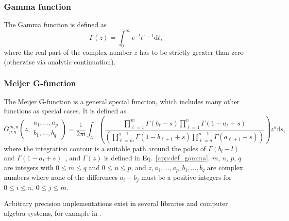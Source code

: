 \subsubsection*{Gamma function}
The Gamma funciton is defined as~\cite[Eq.~5.2.1]{NIST:DLMF}
\begin{equation}
\label{app:def_gamma}
\Gamma\left(z\right)=\int_{0}^{\infty}e^{-t}t^{z-1}\mathrm{d}t,
\end{equation}
where the real part of the complex number $z$ has to be strictly greater than zero (otherwise via analytic continuation).
\subsubsection*{Meijer G-function}
The Meijer G-function is a general special function, which includes many other functions as special cases. It is defined as
\begin{equation}
\label{app:def_meijerG}
G^{m,n}_{p,q}\left(z,
\begin{matrix}
a_1,...,a_p\\
b_1,...,b_q
\end{matrix}
\right)
=
\frac{1}{2\pi\mathrm{i}}\int_{L%
}\left({\textstyle\frac{\prod\limits_{\ell=1}^{m}\Gamma\left(b_{\ell}-s\right%
)\prod\limits_{\ell=1}^{n}\Gamma\left(1-a_{\ell}+s\right)}{\left(\prod\limits_%
{\ell=m}^{q-1}\Gamma\left(1-b_{\ell+1}+s\right)\prod\limits_{\ell=n}^{p-1}%
\Gamma\left(a_{\ell+1}-s\right)\right)}}\right)z^{s}\mathrm{d}s,
\end{equation}
where the integration contour is a suitable path around the poles of $\Gamma(b_l-l)$ and \mbox{$\Gamma(1-a_l+s)$}~\cite[Eq.~16.17.1]{NIST:DLMF}, and $\Gamma(z)$ is defined in Eq.~\eqref{app:def_gamma}. $m$, $n$, $p$, $q$ are integers with $0 \leq m \leq q$ and $0 \leq n \leq p$, and $z,a_1,...,a_p,b_1,...,b_q$ are complex numbers where none of the differences $a_i-b_j$ must be a positive integers for $0\leq i \leq n$, $0\leq j \leq m$.

Arbitrary precision implementations exist in several libraries and computer algebra systems, for example in \cite{mpmath,Mathematica}.

